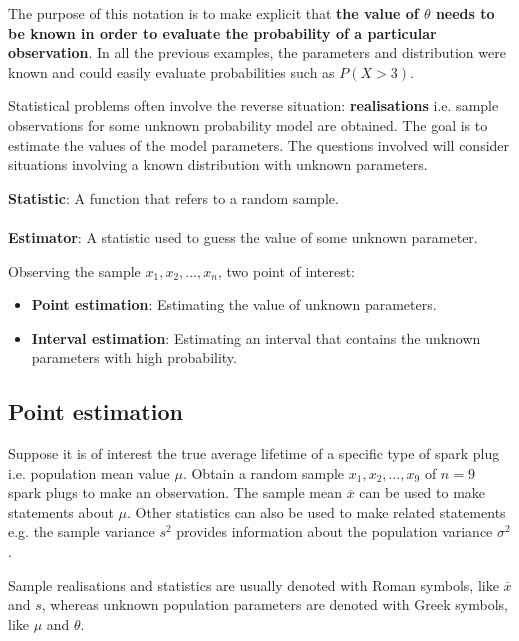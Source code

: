 \documentclass[10pt,a4paper]{article}
\begin{document}
The purpose of this notation is to make explicit that \textbf{the value of $\theta$ needs to be
known in order to evaluate the probability of a particular observation}. In all the previous
examples, the parameters and distribution were known and could easily evaluate probabilities such as $P(X >
3)$. 

Statistical problems often involve the reverse situation: \textbf{realisations} i.e. sample
observations for some unknown probability model are obtained. The goal is to estimate the values of
the model parameters. The questions involved will consider situations involving a known distribution
with unknown parameters. 

\begin{tcolorbox}[breakable,colback=white]
\textbf{Statistic}: A function that refers to a random sample.
\\
\\
\textbf{Estimator}: A statistic used to guess the value of some unknown parameter.
\end{tcolorbox}

Observing the sample $x_1, x_2,\dots, x_n$, two point of interest:
\begin{itemize}
    \item \textbf{Point estimation}: Estimating the value of unknown parameters.
    \item \textbf{Interval estimation}: Estimating an interval that contains the unknown parameters with high probability.
\end{itemize}

\subsection{Point estimation}

Suppose it is of interest the true average lifetime of a speciﬁc type of spark plug i.e. population
mean value $\mu$. Obtain a random sample $x_1, x_2,\dots, x_9$ of $n = 9$ spark plugs to make an
observation. The sample mean $\overline{x}$ can be used to make statements about $\mu$. Other statistics
can also be used to make related statements e.g. the sample variance $s^2$ provides information
about the population variance $\sigma^2$.

\begin{tcolorbox}[breakable,colback=white]
    Sample realisations and statistics are usually denoted with Roman symbols, like $\overline{x}$
    and $s$, whereas unknown population parameters are denoted with Greek symbols, like $\mu$ and $\theta$.
\end{tcolorbox}
\end{document}
